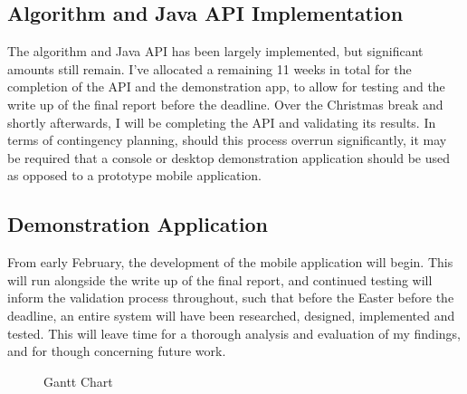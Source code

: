 \subsection{Algorithm and Java API Implementation}

The algorithm and Java API has been largely implemented, but significant amounts still remain. I've allocated a remaining 11 weeks in total for the completion of the API and the demonstration app, to allow for testing and the write up of the final report before the deadline. Over the Christmas break and shortly afterwards, I will be completing the API and validating its results. In terms of contingency planning, should this process overrun significantly, it may be required that a console or desktop demonstration application should be used as opposed to a prototype mobile application. 

\subsection{Demonstration Application}

From early February, the development of the mobile application will begin. This will run alongside the write up of the final report, and continued testing will inform the validation process throughout, such that before the Easter before the deadline, an entire system will have been researched, designed, implemented and tested. This will leave time for a thorough analysis and evaluation of my findings, and for though concerning future work. 

\begin{figure}[p]
    \caption{Gantt Chart}
\end{figure}


